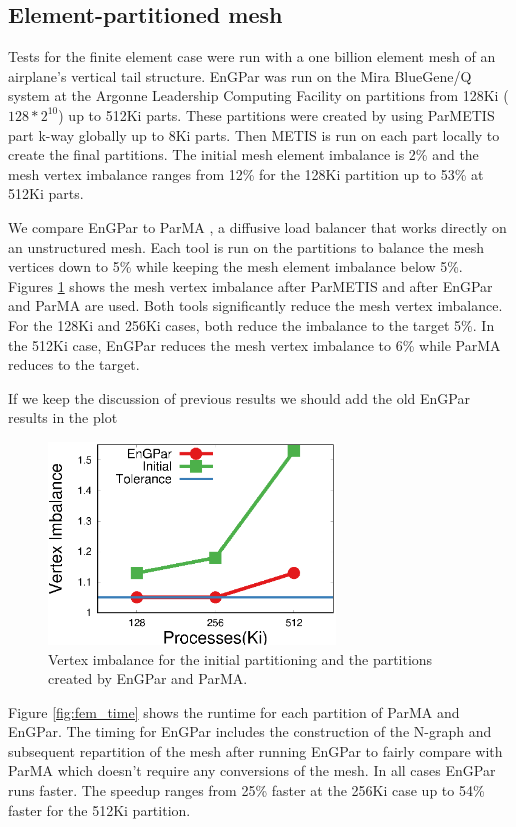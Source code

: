 \documentclass[conference]{IEEEtran}
\begin{document}
\subsection{Element-partitioned mesh}

Tests for the finite element case were run with a one billion element mesh of an airplane's
vertical tail structure. EnGPar was run on the Mira BlueGene/Q system at the Argonne Leadership
Computing Facility \cite{haring2012ibm} on partitions from 128Ki ($128*2^{10}$) up to 512Ki parts.
These partitions were created by using ParMETIS part k-way \cite{karypis1999parallel} globally
up to 8Ki parts. Then METIS is run on each part locally to create the final partitions.
The initial mesh element imbalance is 2\% and the mesh vertex imbalance ranges from 12\% for
the 128Ki partition up to 53\% at 512Ki parts.

We compare EnGPar to ParMA \cite{SmithParma2015}, a diffusive load balancer that
works directly on an unstructured mesh.
Each tool is run on the partitions to balance the mesh vertices down to 5\% while keeping the mesh
element imbalance below 5\%. Figures \ref{fig:fem_vtximb} shows the mesh vertex imbalance after
ParMETIS and after EnGPar and ParMA are used. Both tools significantly reduce the mesh vertex
imbalance. For the 128Ki and 256Ki cases, both reduce the imbalance to the target 5\%. In
the 512Ki case, EnGPar reduces the mesh vertex imbalance to 6\% while ParMA reduces to the
target.

{\color{red} If we keep the discussion of previous results we should add the old EnGPar results in the plot}
\begin{figure}[!ht]
  \centering
  \includegraphics[width=3in]{plots/mira_fem_results/vimb_v_cores}
  \caption{Vertex imbalance for the initial partitioning and the partitions created by
    EnGPar and ParMA.}
  \label{fig:fem_vtximb}
\end{figure}

Figure \ref{fig:fem_time} shows the runtime for each partition of ParMA and EnGPar. The
timing for EnGPar includes the construction of the N-graph and subsequent repartition of
the mesh after running EnGPar to fairly compare with ParMA which doesn't require any
conversions of the mesh. In all cases EnGPar runs faster. The speedup ranges from
25\% faster at the 256Ki case up to 54\% faster for the 512Ki partition.
\end{document}
